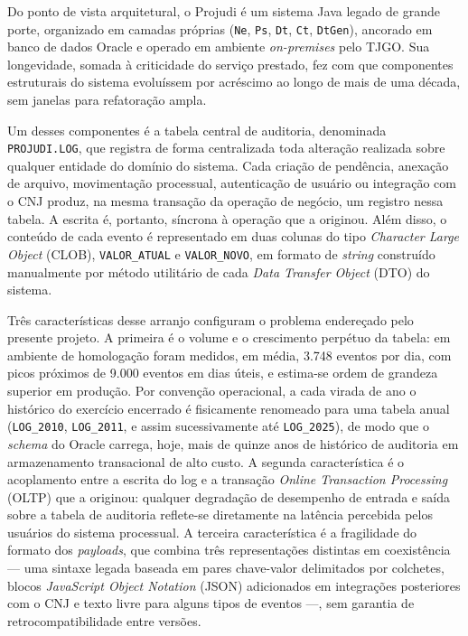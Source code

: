 \documentclass[12pt,letterpaper,oneside]{report}
\begin{document}
Do ponto de vista arquitetural, o Projudi é um sistema Java legado de grande porte, organizado em camadas próprias (\texttt{Ne}, \texttt{Ps}, \texttt{Dt}, \texttt{Ct}, \texttt{DtGen}), ancorado em banco de dados Oracle e operado em ambiente \textit{on-premises} pelo TJGO. Sua longevidade, somada à criticidade do serviço prestado, fez com que componentes estruturais do sistema evoluíssem por acréscimo ao longo de mais de uma década, sem janelas para refatoração ampla.

Um desses componentes é a tabela central de auditoria, denominada \texttt{PROJUDI.LOG}, que registra de forma centralizada toda alteração realizada sobre qualquer entidade do domínio do sistema. Cada criação de pendência, anexação de arquivo, movimentação processual, autenticação de usuário ou integração com o CNJ produz, na mesma transação da operação de negócio, um registro nessa tabela. A escrita é, portanto, síncrona à operação que a originou. Além disso, o conteúdo de cada evento é representado em duas colunas do tipo \textit{Character Large Object} (CLOB), \texttt{VALOR\_ATUAL} e \texttt{VALOR\_NOVO}, em formato de \textit{string} construído manualmente por método utilitário de cada \textit{Data Transfer Object} (DTO) do sistema.

Três características desse arranjo configuram o problema endereçado pelo presente projeto. A primeira é o volume e o crescimento perpétuo da tabela: em ambiente de homologação foram medidos, em média, 3.748 eventos por dia, com picos próximos de 9.000 eventos em dias úteis, e estima-se ordem de grandeza superior em produção. Por convenção operacional, a cada virada de ano o histórico do exercício encerrado é fisicamente renomeado para uma tabela anual (\texttt{LOG\_2010}, \texttt{LOG\_2011}, e assim sucessivamente até \texttt{LOG\_2025}), de modo que o \textit{schema} do Oracle carrega, hoje, mais de quinze anos de histórico de auditoria em armazenamento transacional de alto custo. A segunda característica é o acoplamento entre a escrita do log e a transação \textit{Online Transaction Processing} (OLTP) que a originou: qualquer degradação de desempenho de entrada e saída sobre a tabela de auditoria reflete-se diretamente na latência percebida pelos usuários do sistema processual. A terceira característica é a fragilidade do formato dos \textit{payloads}, que combina três representações distintas em coexistência — uma sintaxe legada baseada em pares chave-valor delimitados por colchetes, blocos \textit{JavaScript Object Notation} (JSON) adicionados em integrações posteriores com o CNJ e texto livre para alguns tipos de eventos —, sem garantia de retrocompatibilidade entre versões.
\end{document}
